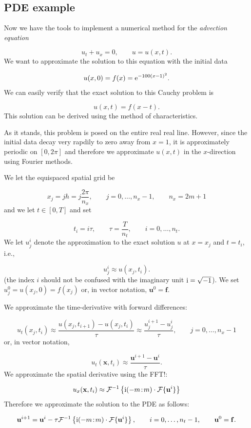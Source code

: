 \documentclass[12pt,landscape]{article}
\begin{document}
{\subsection{PDE example}
Now we have the tools to implement a numerical method for the \emph{advection equation}

\[
u_t + u_x = 0, \qquad u = u(x,t).
\]
We want to approximate the solution to this equation with the initial data

\[
u(x,0) = f(x) = {\rm e}^{-100(x-1)^2}.
\]
We can easily verify that the exact solution to this Cauchy problem is

\[
u(x,t) = f(x - t).
\]
This solution can be derived using the method of characteristics.     

As it stands, this problem is posed on the entire real real line.  However, since the initial data decay very rapdily to zero away from $x=1$, it is approximately periodic on $[0, 2\pi]$ and therefore we approximate $u(x,t)$ in the $x$-direction using Fourier methods. 

We let the equispaced spatial grid be

\[
x_j = jh = j \frac{2\pi}{n_x}, \qquad j = 0, \ldots, n_x-1, \qquad n_x = 2m+1
\]
and we let $t \in [0, T]$ and set

\[
t_i = i\tau, \qquad \tau = \frac{T}{n_t}, \qquad i = 0, \ldots, n_t.
\]
We let $u^{i}_j$ denote the approximation to the exact solution $u$ at $x=x_j$ and $t = t_i$, i.e.,

\[
u^{i}_j \approx u(x_j, t_i).
\]
(the index $i$ should not be confused with the imaginary unit ${\rm i} = \sqrt{-1}$).  We set $u^{0}_j = u(x_j,0) = f(x_j)$ or, in vector notation, $\mathbf{u}^{0} = \mathbf{f}$.

We approximate the time-derivative with forward differences:

\[
u_t(x_j,t_i) \approx \frac{u(x_j,t_{i+1}) - u(x_j,t_{i})}{\tau} \approx \frac{u^{i+1}_j - u^{i}_j}{\tau}, \qquad j = 0, \ldots, n_x-1
\]
or, in vector notation,

\[
u_t(\mathbf{x},t_i) \approx \frac{\mathbf{u}^{i+1} - \mathbf{u}^{i}}{\tau}.
\]
We approximate the spatial derivative using the FFT!:

\[
u_x(\mathbf{x},t_i) \approx \mathcal{F}^{-1}\left\lbrace {\rm i}(-m\!:\!m)\cdot\mathcal{F}\lbrace \mathbf{u}^{i} \rbrace\right\rbrace
\]
Therefore we approximate the solution to the PDE as follows:

\[
\mathbf{u}^{i+1} = \mathbf{u}^{i} - \tau \mathcal{F}^{-1}\left\lbrace {\rm i}(-m\!:\!m)\cdot\mathcal{F}\lbrace \mathbf{u}^{i} \rbrace\right\rbrace, \qquad i = 0, \ldots, n_t-1, \qquad \mathbf{u}^0 = \mathbf{f}.
\]

}
\end{document}
